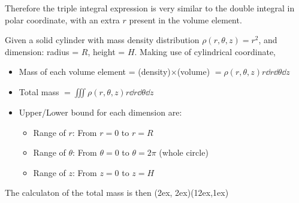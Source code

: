 \documentclass[class=article, crop=false, 12pt]{standalone}
\begin{document}


Therefore the triple integral expression is very similar to the double integral in polar coordinate,
with an extra $r$ present in the volume element.


\begin{example}
    Given a solid cylinder with mass density distribution $\rho(r,\theta,z) = r^2$,
    and dimension: radius = $R$, height = $H$. 
    Making use of cylindrical coordinate,
    \begin{itemize}
        \item Mass of each volume element = (density)$\times$(volume) $= \rho(r,\theta,z)r\dd{r}\dd{\theta}\dd{z}$
        \item Total mass $= \iiint \rho(r,\theta,z) r\dd{r}\dd{\theta}\dd{z}$
        \item Upper/Lower bound for each dimension are:
        \begin{itemize}
            \item Range of $r$: From $r=0$ to $r=R$
            \item Range of $\theta$: From $\theta=0$ to $\theta = 2\pi$ (whole circle)
            \item Range of $z$: From $z=0$ to $z=H$
        \end{itemize}
    \end{itemize}
    

    The calculaton of the total mass is then
    {(2ex, 2ex)}{(12ex,1ex)}
\end{example}
\end{document}
